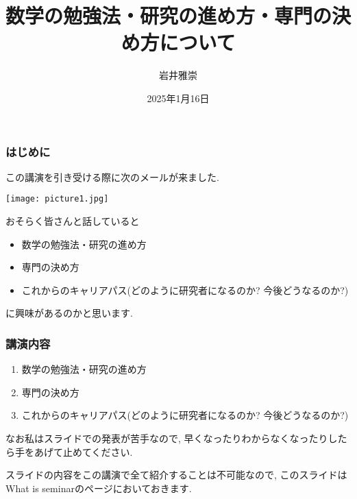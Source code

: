 \documentclass[11pt,dvipdfmx]{beamer}
\title[数学の勉強法・研究の進め方・専門の決め方について]{数学の勉強法・研究の進め方・専門の決め方について}
\author[岩井雅崇]{岩井雅崇}
\institute[大阪大学理学研究科]{大阪大学理学研究科}
\date{2025年1月16日}  %
\theoremstyle{definition}
\theoremstyle{remark}
\begin{document}

\begin{frame}  %
 \titlepage    %
\end{frame}





\begin{frame}
\frametitle{はじめに}
この講演を引き受ける際に次のメールが来ました. 

\pause
\begin{center}
 \texttt{[image: picture1.jpg]}
\end{center}

おそらく皆さんと話していると
\begin{itemize}
\item 数学の勉強法・研究の進め方
\item 専門の決め方
\item これからのキャリアパス(どのように研究者になるのか? 今後どうなるのか?)
\end{itemize}
に興味があるのかと思います.

\end{frame}



\begin{frame}  %

 \frametitle{講演内容}
 \begin{center}
\begin{enumerate}
\item 数学の勉強法・研究の進め方
\item 専門の決め方
\item これからのキャリアパス(どのように研究者になるのか? 今後どうなるのか?)
\end{enumerate}

 \end{center}
 
 \vspace{11pt}
なお私はスライドでの発表が苦手なので, 早くなったりわからなくなったりしたら手をあげて止めてください.  

 \vspace{11pt}
 スライドの内容をこの講演で全て紹介することは不可能なので, このスライドはWhat is seminarのページにおいておきます. 
\end{frame}
\end{document}
